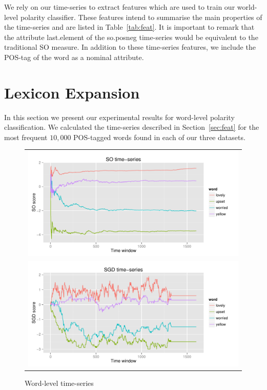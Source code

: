 \documentclass{sig-alternate}
\begin{document}
We rely on our time-series to extract features which are used to train our world-level polarity classifier. These features intend to summarise the main properties of the time-series and are listed in Table~\ref{tab:feat}. It is important to remark that the attribute last.element of the so.posneg time-series would be equivalent to the traditional SO measure. In addition to these time-series features, we include the POS-tag of the word as a nominal attribute.



\section{Lexicon Expansion}\label{sec:lex_expand}


In this section we present our experimental results for word-level polarity classification. We calculated the time-series described in Section~\ref{sec:feat} for the most frequent $10,000$ POS-tagged words found in each of our three datasets. 

\begin{figure}[ht]
\begin{center}
\begin{tabular}{c}
\includegraphics[scale=0.45]{SOseries.pdf} \\
\includegraphics[scale=0.45]{SGDseries.pdf}\\
\end{tabular}
\caption{Word-level time-series}
\label{fig:timeseries}
\end{center}
\end{figure}
\end{document}
